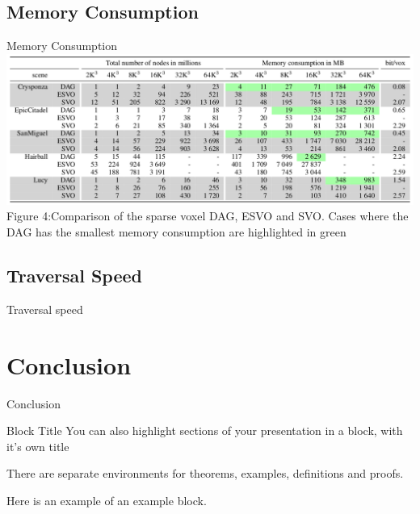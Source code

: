 \documentclass{beamer}
\begin{document}
\subsection{Memory Consumption}
\begin{frame}{Memory Consumption}
	\includegraphics[scale=0.27]{images/mem-consumption.png}{\\Figure 4:Comparison of the sparse voxel DAG, ESVO and SVO. Cases where the DAG has the smallest memory consumption are highlighted in green}
\end{frame}

\subsection{Traversal Speed}
\begin{frame}{Traversal speed}

\end{frame}

\section{Conclusion}
\begin{frame}{Conclusion}
\begin{block}{Block Title}
You can also highlight sections of your presentation in a block, with it's own title
\end{block}
\begin{theorem}
There are separate environments for theorems, examples, definitions and proofs.
\end{theorem}
\begin{example}
Here is an example of an example block.
\end{example}
\end{frame}
\end{document}
